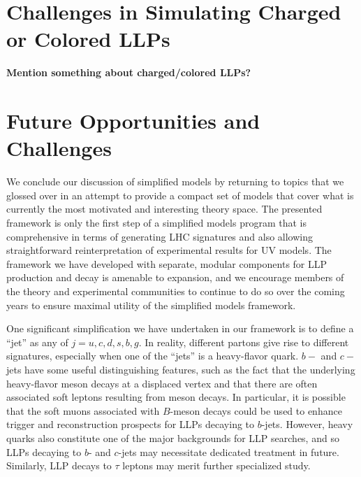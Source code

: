 \section{Challenges in Simulating Charged or Colored LLPs}\label{sec:simsec}

{\bf Mention something about charged/colored LLPs?}

\section{Future Opportunities and Challenges}\label{sec:simplified_future}

We conclude our discussion of simplified models by returning to topics that we glossed over in an attempt to provide a compact set of models that cover what is currently the most motivated and interesting theory space. The presented framework is only the first step of a simplified models program that is comprehensive in terms of generating LHC signatures and also allowing straightforward reinterpretation of experimental results for UV models. The framework we have developed with separate, modular components for LLP production and decay is amenable to expansion, and we encourage members of the theory and experimental communities to continue to do so over the coming years to ensure maximal utility of the simplified models framework.

One significant simplification we have undertaken in our framework is to define a ``jet'' as any of $j=u,c,d,s,b,g$. In reality, different partons give rise to different signatures, especially when one of the ``jets'' is a heavy-flavor quark. $b-$ and $c-$jets have some useful distinguishing features, such as the fact that the underlying heavy-flavor meson decays at a displaced vertex and that there are often associated soft leptons resulting from meson decays. In particular, it is possible that the soft muons associated with $B$-meson decays could be used to enhance trigger and reconstruction prospects for LLPs decaying to $b$-jets. However, heavy quarks also constitute one of the major backgrounds for LLP searches, and so LLPs decaying to $b$- and $c$-jets may necessitate dedicated treatment in future. Similarly, LLP decays to $\tau$ leptons may merit further specialized study.

